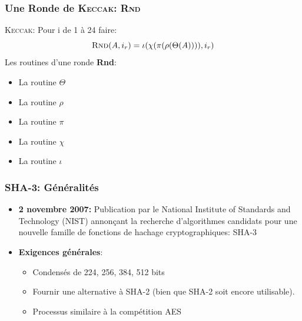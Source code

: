 \begin{frame}
  \frametitle{Une Ronde de \textsc{Keccak}: \textsc{Rnd}}
  \vfill
  \textsc{Keccak}: Pour i de 1 à 24 faire: 
$$\textsc{Rnd}(A,i_r)=\iota ( \chi ( \pi ( \rho (\Theta (A)))), i_r)$$
\vspace{1cm}
Les routines d'une ronde \textbf{Rnd}:
  \begin{itemize}
  \item{La routine $\Theta$}
  \item{La routine $\rho$}
  \item{La routine $\pi$}
  \item{La routine $\chi$}
  \item{La routine $\iota$}
   \end{itemize}
  \vfill
\end{frame}

\begin{frame}
  \frametitle{SHA-3: Généralités}
  \vfill
\begin{itemize}
\item{\textbf{2 novembre 2007:} Publication par le National Institute of         Standards and Technology (NIST) annonçant la recherche d'algorithmes candidats pour une nouvelle famille de fonctions de hachage cryptographiques: SHA-3}
  \vfill
        \item{
        \textbf{Exigences générales}:
                \begin{itemize}
                \item{Condensés de 224, 256, 384, 512 bits }
                \item{Fournir une alternative à SHA-2 (bien que SHA-2 soit encore                 utilisable).}
                \item{Processus similaire à la compétition AES}
                \end{itemize}
        }
\end{itemize}
\vfill
\end{frame}

